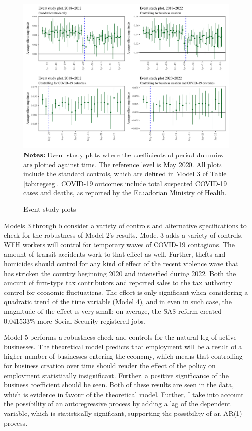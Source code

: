 \documentclass[11pt,a4paper]{article}\usepackage[]{graphicx}\usepackage[]{xcolor}
\makeatletter
\def\maxwidth{ %
  \ifdim\Gin@nat@width>\linewidth
    \linewidth
  \else
    \Gin@nat@width
  \fi
}
\newenvironment{knitrout}{}{} %
\makeatother
\begin{document}
\begin{figure}[htbp!]
\caption{Event study plots}
\label{fig:event}
\begin{knitrout}
\color{fgcolor}
\includegraphics[width=\maxwidth]{figure/event-study-1} 
\end{knitrout}
\textbf{Notes:} Event study plots where the coefficients of period dummies are plotted against time. The reference level is May 2020. All plots include the standard controls, which are defined in Model 3 of Table \ref{tab:regseg}. COVID-19 outcomes include total suspected COVID-19 cases and deaths, as reported by the Ecuadorian Ministry of Health.
\end{figure}

Models 3 through 5 consider a variety of controls and alternative specifications to check for the robustness of Model 2's results. Model 3 adds a variety of controls. WFH workers will control for temporary waves of COVID-19 contagions. The amount of transit accidents work to that effect as well. Further, thefts and homicides should control for any kind of effect of the recent violence wave that has stricken the country beginning 2020 and intensified during 2022. Both the amount of firm-type tax contributors and reported sales to the tax authority control for economic fluctuations. The effect is only significant when considering a quadratic trend of the time variable (Model 4), and in even in such case, the magnitude of the effect is very small: on average, the SAS reform created 0.041533\% more Social Security-registered jobs. 

Model 5 performs a robustness check and controls for the natural log of active businesses. The theoretical model predicts that employment will be a result of a higher number of businesses entering the economy, which means that controlling for business creation over time should render the effect of the policy on employment statistically insignificant. Further, a positive significance of the business coefficient should be seen. Both of these results are seen in the data, which is evidence in favour of the theoretical model. Further, I take into account the possibility of an autoregressive process by adding a lag of the dependent variable, which is statistically significant, supporting the possibility of an AR(1) process. 
\end{document}
